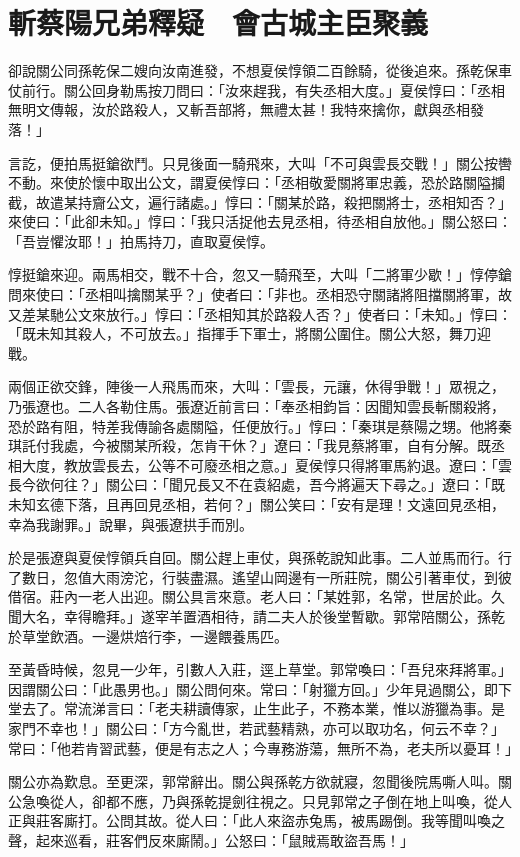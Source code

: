 
\chapter{斬蔡陽兄弟釋疑　會古城主臣聚義}

卻說關公同孫乾保二嫂向汝南進發，不想夏侯惇領二百餘騎，從後追來。孫乾保車仗前行。關公回身勒馬按刀問曰：「汝來趕我，有失丞相大度。」夏侯惇曰：「丞相無明文傳報，汝於路殺人，又斬吾部將，無禮太甚！我特來擒你，獻與丞相發落！」

言訖，便拍馬挺鎗欲鬥。只見後面一騎飛來，大叫「不可與雲長交戰！」關公按轡不動。來使於懷中取出公文，謂夏侯惇曰：「丞相敬愛關將軍忠義，恐於路關隘攔截，故遣某持齎公文，遍行諸處。」惇曰：「關某於路，殺把關將士，丞相知否？」來使曰：「此卻未知。」惇曰：「我只活捉他去見丞相，待丞相自放他。」關公怒曰：「吾豈懼汝耶！」拍馬持刀，直取夏侯惇。

惇挺鎗來迎。兩馬相交，戰不十合，忽又一騎飛至，大叫「二將軍少歇！」惇停鎗問來使曰：「丞相叫擒關某乎？」使者曰：「非也。丞相恐守關諸將阻擋關將軍，故又差某馳公文來放行。」惇曰：「丞相知其於路殺人否？」使者曰：「未知。」惇曰：「既未知其殺人，不可放去。」指揮手下軍士，將關公圍住。關公大怒，舞刀迎戰。

兩個正欲交鋒，陣後一人飛馬而來，大叫：「雲長，元讓，休得爭戰！」眾視之，乃張遼也。二人各勒住馬。張遼近前言曰：「奉丞相鈞旨：因聞知雲長斬關殺將，恐於路有阻，特差我傳諭各處關隘，任便放行。」惇曰：「秦琪是蔡陽之甥。他將秦琪託付我處，今被關某所殺，怎肯干休？」遼曰：「我見蔡將軍，自有分解。既丞相大度，教放雲長去，公等不可廢丞相之意。」夏侯惇只得將軍馬約退。遼曰：「雲長今欲何往？」關公曰：「聞兄長又不在袁紹處，吾今將遍天下尋之。」遼曰：「既未知玄德下落，且再回見丞相，若何？」關公笑曰：「安有是理！文遠回見丞相，幸為我謝罪。」說畢，與張遼拱手而別。

於是張遼與夏侯惇領兵自回。關公趕上車仗，與孫乾說知此事。二人並馬而行。行了數日，忽值大雨滂沱，行裝盡濕。遙望山岡邊有一所莊院，關公引著車仗，到彼借宿。莊內一老人出迎。關公具言來意。老人曰：「某姓郭，名常，世居於此。久聞大名，幸得瞻拜。」遂宰羊置酒相待，請二夫人於後堂暫歇。郭常陪關公，孫乾於草堂飲酒。一邊烘焙行李，一邊餵養馬匹。

至黃昏時候，忽見一少年，引數人入莊，逕上草堂。郭常喚曰：「吾兒來拜將軍。」因謂關公曰：「此愚男也。」關公問何來。常曰：「射獵方回。」少年見過關公，即下堂去了。常流涕言曰：「老夫耕讀傳家，止生此子，不務本業，惟以游獵為事。是家門不幸也！」關公曰：「方今亂世，若武藝精熟，亦可以取功名，何云不幸？」常曰：「他若肯習武藝，便是有志之人；今專務游蕩，無所不為，老夫所以憂耳！」

關公亦為歎息。至更深，郭常辭出。關公與孫乾方欲就寢，忽聞後院馬嘶人叫。關公急喚從人，卻都不應，乃與孫乾提劍往視之。只見郭常之子倒在地上叫喚，從人正與莊客廝打。公問其故。從人曰：「此人來盜赤兔馬，被馬踢倒。我等聞叫喚之聲，起來巡看，莊客們反來廝鬧。」公怒曰：「鼠賊焉敢盜吾馬！」

